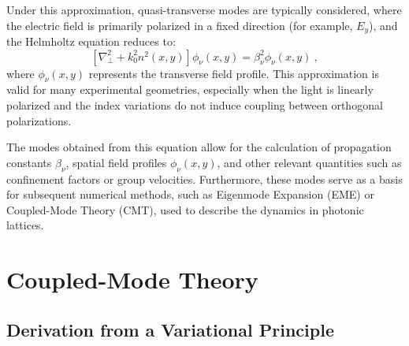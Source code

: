 Under this approximation, quasi-transverse modes are typically considered, where the electric field is primarily polarized in a fixed direction (for example, \( E_y \)), and the Helmholtz equation reduces to:
\begin{equation}
	\left[\nabla_\perp^2 + k_0^2 n^2(x,y) \right] \phi_\nu(x,y) = \beta_\nu^2 \phi_\nu(x,y) \ ,
\end{equation}
where \( \phi_\nu(x,y) \) represents the transverse field profile. This approximation is valid for many experimental geometries, especially when the light is linearly polarized and the index variations do not induce coupling between orthogonal polarizations.

The modes obtained from this equation allow for the calculation of propagation constants \( \beta_\nu \), spatial field profiles \( \phi_\nu(x,y) \), and other relevant quantities such as confinement factors or group velocities. Furthermore, these modes serve as a basis for subsequent numerical methods, such as Eigenmode Expansion (EME) or Coupled-Mode Theory (CMT), used to describe the dynamics in photonic lattices.
\section{Coupled-Mode Theory \label{cap:CMTteo}}
\subsection{Derivation from a Variational Principle}

